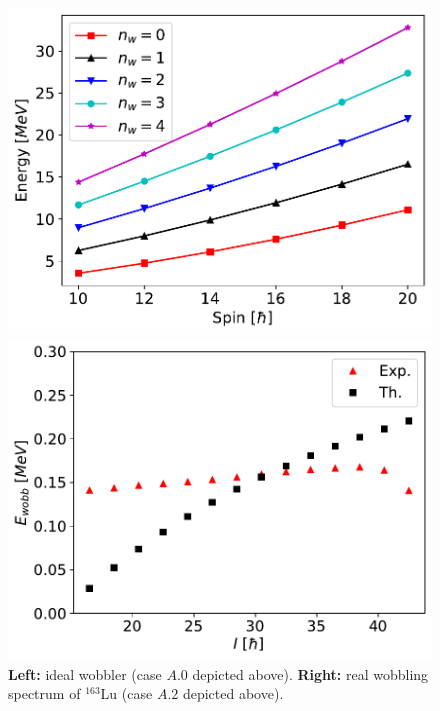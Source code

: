 \documentclass[final]{beamer}
\newlength{\colwidth}
\begin{document}
\begin{frame}[t]
\begin{columns}[t]
\begin{column}{\colwidth}
 \begin{figure}
\centering
\begin{minipage}{.5\textwidth}
  \centering
  \includegraphics[scale=0.95]{images/simple_wobbling_spectrum.pdf}
\end{minipage}%
\begin{minipage}{.5\textwidth}
  \centering
 \includegraphics[scale=0.95]{images/wobbling_energy_ThExp.pdf}
\end{minipage}
\caption{\textbf{Left:} ideal wobbler (case $A.0$ depicted above). \textbf{Right:} real wobbling spectrum of $^{163}$Lu (case $A.2$ depicted above).}
    \label{energy-function-min-point-evolution}
\end{figure}
 

\end{column}
\end{columns}
\end{frame}
\end{document}
